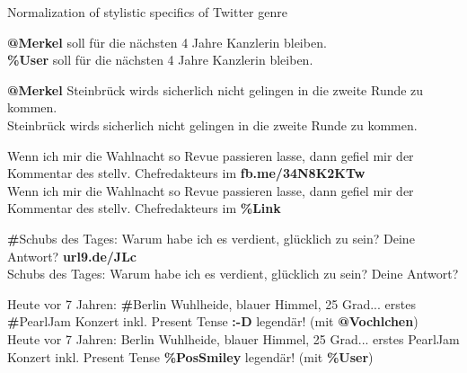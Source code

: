 \documentclass{beamer}
\begin{document}
\begin{frame}{Normalization of stylistic specifics of Twitter genre}
  \begin{example}
    \textbf{@Merkel} soll f\"ur die n\"achsten 4 Jahre Kanzlerin
    bleiben.\\ \textbf{\%User} soll f\"ur die n\"achsten 4 Jahre Kanzlerin
    bleiben.
  \end{example}

  \begin{example}
    \textbf{@Merkel} Steinbr\"uck wirds sicherlich nicht gelingen in die zweite Runde zu kommen.\\
    Steinbr\"uck wirds sicherlich nicht gelingen in die zweite Runde zu kommen.
  \end{example}
\end{frame}

\begin{frame}{}
  \begin{example}
    Wenn ich mir die Wahlnacht so Revue passieren lasse, dann gefiel mir der
    Kommentar des stellv. Chefredakteurs im \textbf{fb.me/34N8K2KTw}\\
    Wenn ich mir die Wahlnacht so Revue passieren lasse, dann gefiel mir der
    Kommentar des stellv. Chefredakteurs im \textbf{\%Link}
  \end{example}

  \begin{example}
    \textbf{\#}Schubs des Tages: Warum habe ich es verdient, glücklich zu sein? Deine
    Antwort? \textbf{url9.de/JLc}\\
    Schubs des Tages: Warum habe ich es verdient, glücklich zu sein? Deine
    Antwort?
  \end{example}
\end{frame}

\begin{frame}{}
  \begin{example}
    Heute vor 7 Jahren: \textbf{\#}Berlin Wuhlheide, blauer Himmel, 25 Grad... erstes
    \textbf{\#}PearlJam Konzert inkl. Present Tense \textbf{:-D} legend\"ar! (mit
    \textbf{@Vochlchen})\\
    Heute vor 7 Jahren: Berlin Wuhlheide, blauer Himmel, 25 Grad... erstes
    PearlJam Konzert inkl. Present Tense \textbf{\%PosSmiley} legend\"ar! (mit
    \textbf{\%User})
  \end{example}
\end{frame}
\end{document}
